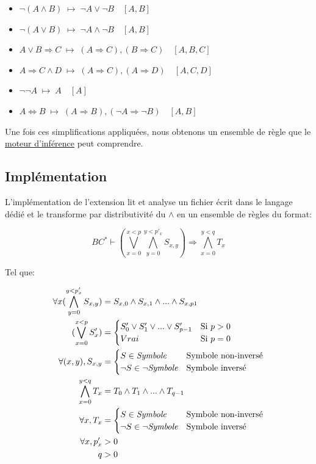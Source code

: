 \documentclass[12pt]{article}
\begin{document}
\begin{itemize}
  \item $\neg(A \land B) \; \mapsto \; \neg{A} \lor \neg{B} \quad [A, B]$
  \item $\neg(A \lor B) \; \mapsto \; \neg{A} \land \neg{B} \quad [A, B]$
  \item $A \lor B \Rightarrow C \; \mapsto \; (A \Rightarrow C), (B \Rightarrow C) \quad [A, B, C]$
  \item $A \Rightarrow C \land D \; \mapsto \; (A \Rightarrow C), (A \Rightarrow D) \quad [A, C, D]$
  \item $\neg \neg A \; \mapsto \; A \quad [A]$
  \item $A \Leftrightarrow B \; \mapsto \; (A \Rightarrow B), (\neg A \Rightarrow \neg B) \quad [A, B]$
\end{itemize}

Une fois ces simplifications appliquées, nous obtenons un ensemble de règle que le \hyperref[MI]{moteur d'inférence} peut comprendre.

\subsection{Implémentation}

L'implémentation de l'extension lit et analyse un fichier écrit dans le langage dédié et le transforme par distributivité du $\land$ en un ensemble de règles du format:

\[BC^{*} \vdash (\bigvee_{x=0}^{x < p}\bigwedge_{y=0}^{y < p'_x} S_{x,y}) \Rightarrow \bigwedge_{x=0}^{y < q} T_x\]

Tel que:

\begin{align}
  \forall x (\bigwedge_{y=0}^{y < p'_x} S_{x,y})
    &= S_{x,0} \land S_{x,1} \land ... \land S_{x,p\-1} \\
  (\bigvee_{x=0}^{x < p} S_x')
    &= \begin{cases}
      S_0' \lor S_1' \lor ... \lor S_{p-1}' & \text{Si } p > 0 \\
      Vrai & \text{Si } p = 0
    \end{cases} \\
  \forall (x, y), S_{x,y}
    &= \begin{cases}
      S \in \textit{Symbole} & \text{Symbole non-inversé} \\
      \neg S \in \neg \textit{Symbole} & \text{Symbole inversé}
    \end{cases} \\
  \bigwedge_{x=0}^{y < q} T_x
    &= T_0 \land T_1 \land ... \land T_{q-1} \\
  \forall x, T_x
    &= \begin{cases}
      S \in \textit{Symbole} & \text{Symbole non-inversé} \\
      \neg S \in \neg \textit{Symbole} & \text{Symbole inversé}
    \end{cases} \\
  \forall x, p'_x &> 0 \\
  q &> 0
\end{align}
\end{document}
